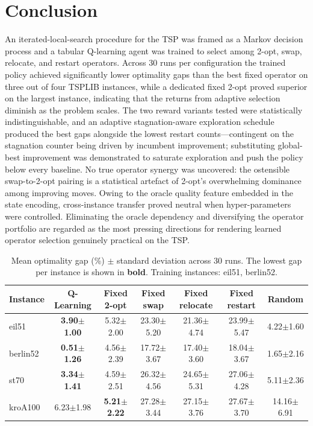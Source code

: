 \documentclass[10pt,twocolumn]{article}
\begin{document}
\section{Conclusion}
An iterated-local-search procedure for the TSP was framed as a Markov decision
process and a tabular Q-learning agent was trained to select among 2-opt, swap,
relocate, and restart operators. Across 30 runs per configuration the trained
policy achieved significantly lower optimality gaps than the best fixed operator
on three out of four TSPLIB instances, while a dedicated fixed 2-opt proved
superior on the largest instance, indicating that the returns from adaptive
selection diminish as the problem scales. The two reward variants tested were
statistically indistinguishable, and an adaptive stagnation-aware exploration
schedule produced the best gaps alongside the lowest restart counts---contingent
on the stagnation counter being driven by incumbent improvement; substituting
global-best improvement was demonstrated to saturate exploration and push the
policy below every baseline. No true operator synergy was uncovered: the
ostensible swap-to-2-opt pairing is a statistical artefact of 2-opt's
overwhelming dominance among improving moves. Owing to the oracle quality
feature embedded in the state encoding, cross-instance transfer proved neutral
when hyper-parameters were controlled. Eliminating the oracle dependency and
diversifying the operator portfolio are regarded as the most pressing
directions for rendering learned operator selection genuinely practical on the
TSP.


\begin{table}[t]
\centering
\caption{Mean optimality gap (\%) $\pm$ standard deviation across 30 runs.
The lowest gap per instance is shown in \textbf{bold}. Training instances:
eil51, berlin52.}
\label{tab:main}
\small
\begin{tabular}{lcccccc}
\toprule
Instance & Q-Learning & Fixed 2-opt & Fixed swap & Fixed relocate & Fixed restart & Random \\
\midrule
eil51    & \textbf{3.90$\pm$1.00} & 5.32$\pm$2.00 & 23.30$\pm$5.20 & 21.36$\pm$4.74 & 23.99$\pm$5.47 & 4.22$\pm$1.60 \\
berlin52 & \textbf{0.51$\pm$1.26} & 4.56$\pm$2.39 & 17.72$\pm$3.67 & 17.40$\pm$3.60 & 18.04$\pm$3.67 & 1.65$\pm$2.16 \\
st70     & \textbf{3.34$\pm$1.41} & 4.59$\pm$2.51 & 26.32$\pm$4.56 & 24.65$\pm$5.31 & 27.06$\pm$4.28 & 5.11$\pm$2.36 \\
kroA100  & 6.23$\pm$1.98 & \textbf{5.21$\pm$2.22} & 27.28$\pm$3.44 & 27.15$\pm$3.76 & 27.67$\pm$3.70 & 14.16$\pm$6.91 \\
\bottomrule
\end{tabular}
\end{table}
\end{document}
